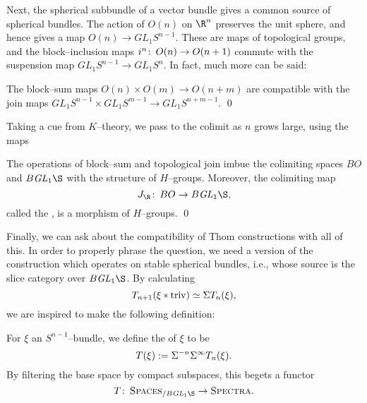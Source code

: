 Next, the spherical subbundle of a vector bundle gives a common source of spherical bundles.  The action of \(O(n)\) on \(\R^n\) preserves the unit sphere, and hence gives a map \(O(n) \to GL_1 S^{n-1}\).  These are maps of topological groups, and the block--inclusion maps \(i^n\colon\thinspace O(n) \to O(n+1)\) commute with the suspension map \(GL_1 S^{n-1} \to GL_1 S^n\).  In fact, much more can be said:
\begin{lemma}\label{JIsMonoidal}
The block--sum maps \(O(n) \times O(m) \to O(n+m)\) are compatible with the join maps \(GL_1 S^{n-1} \times GL_1 S^{m-1} \to GL_1 S^{n+m-1}\). \qed
\end{lemma}
\noindent Taking a cue from \(K\)--theory, we pass to the colimit as \(n\) grows large, using the maps
\begin{center}
\end{center}
\begin{corollary}\label{DefnRealJHomomorphism}
The operations of block--sum and topological join imbue the colimiting spaces \(BO\) and \(B\GL_1 \S\) with the structure of \(H\)--groups.  Moreover, the colimiting map \[J_{\R}\co BO \to B\GL_1 \S,\] called the , is a morphism of \(H\)--groups. \qed
\end{corollary}
\noindent Finally, we can ask about the compatibility of Thom constructions with all of this.  In order to properly phrase the question, we need a version of the construction which operates on stable spherical bundles, i.e., whose source is the slice category over \(B\GL_1 \S\).  By calculating \[T_{n+1}(\xi \ast \text{triv}) \simeq \Sigma T_n(\xi),\] we are inspired to make the following definition:

\begin{definition}
For \(\xi\) an \(S^{n-1}\)--bundle, we define the  of \(\xi\) to be \[T(\xi) := \Sigma^{-n} \Sigma^\infty T_n(\xi).\]  By filtering the base space by compact subspaces, this begets a functor \[T\co \CatOf{Spaces}_{/ B\GL_1 \S} \to \CatOf{Spectra}.\]
\end{definition}

